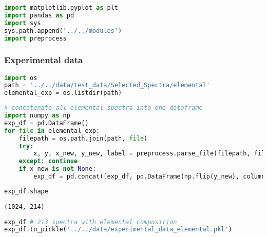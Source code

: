 \begin{lstlisting}[language=Python]
import matplotlib.pyplot as plt
import pandas as pd
import sys
sys.path.append('../../modules')
import preprocess
\end{lstlisting}

\hypertarget{experimental-data}{%
\subsubsection{Experimental data}\label{experimental-data}}

\begin{lstlisting}[language=Python]
import os
path = '../../data/test_data/Selected_Spectra/elemental'
elemental_exp = os.listdir(path)
\end{lstlisting}

\begin{lstlisting}[language=Python]
# concatenate all elemental spectra into one dataframe
import numpy as np
exp_df = pd.DataFrame()
for file in elemental_exp:
    filepath = os.path.join(path, file)
    try:
        x, y, x_new, y_new, label = preprocess.parse_file(filepath, filetype='vms')
    except: continue
    if x_new is not None:
        exp_df = pd.concat([exp_df, pd.DataFrame(np.flip(y_new), columns=['_'.join(label)])], axis=1)
\end{lstlisting}

\begin{lstlisting}[language=Python]
exp_df.shape
\end{lstlisting}

\begin{lstlisting}
(1024, 214)
\end{lstlisting}

\begin{lstlisting}[language=Python]
exp_df # 213 spectra with elemental composition
exp_df.to_pickle('../../data/experimental_data_elemental.pkl')
\end{lstlisting}
